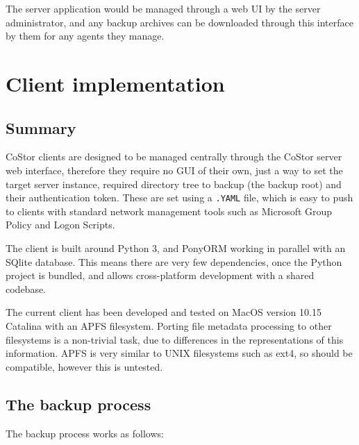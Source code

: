 \documentclass[bsc,frontabs,twoside,singlespacing,parskip,deptreport]{infthesis}     %
\begin{document}
The server application would be managed through a web UI by the server administrator, and any
backup archives can be downloaded through this interface by them for any agents they manage.

\chapter{Client implementation}

\section{Summary}

CoStor clients are designed to be managed centrally through the CoStor server web interface,
therefore they require no GUI of their own, just a way to set the target server instance, 
required directory tree to backup (the backup root) and their authentication token. These are
set using a \texttt{.YAML} file, which is easy to push to clients with standard network 
management tools such as Microsoft Group Policy and Logon Scripts.

The client is built around Python 3, and PonyORM working in parallel with an SQlite database. 
This means there are very few dependencies, once the Python project is bundled, and allows
cross-platform development with a shared codebase.

The current client has been developed and tested on MacOS version 10.15 Catalina with an APFS
filesystem. Porting file metadata processing to other filesystems is a non-trivial task, due 
to differences in the representations of this information. APFS is very similar to UNIX 
filesystems such as ext4, so should be compatible, however this is untested.

\section{The backup process}

The backup process works as follows:
\end{document}
